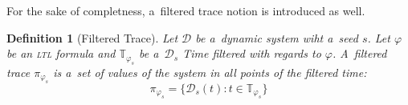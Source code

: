 \documentclass[12pt,oneside,draft]{fithesis}
\newcommand{\mD}{\mathcal{D}}
\newcommand{\mTime}{\mathbb{T}}
\newtheorem{mydef}{Definition}
\begin{document}
For the sake of completness, a~filtered trace notion is introduced as
well.
\begin{mydef}[Filtered Trace]
Let $\mD$ be a~dynamic system wiht a~seed $s$. Let $\varphi$ be an
\textsc{ltl} formula and $\mTime_{\varphi_s}$ be a~$\mD_s$ Time filtered
with regards to $\varphi$. A~filtered trace $\pi_{\varphi_s}$ is a~set of
values of the system in all points of the filtered time:
	\begin{equation}
		\pi_{\varphi_s}=\{\mD_s(t):t\in\mTime_{\varphi_s}\}
	\end{equation}
\end{mydef}
%

%
%
\end{document}
